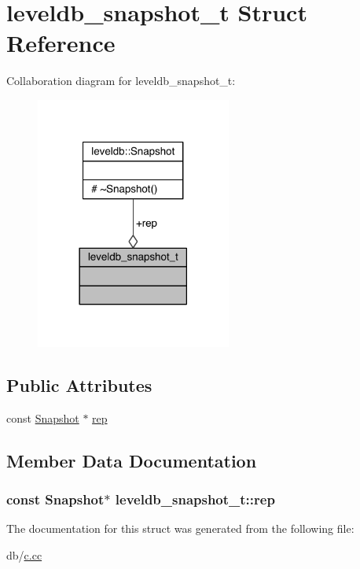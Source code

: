 \hypertarget{structleveldb__snapshot__t}{}\section{leveldb\+\_\+snapshot\+\_\+t Struct Reference}
\label{structleveldb__snapshot__t}


Collaboration diagram for leveldb\+\_\+snapshot\+\_\+t\+:\nopagebreak
\begin{figure}[H]
\begin{center}
\leavevmode
\includegraphics[width=182pt]{structleveldb__snapshot__t__coll__graph}
\end{center}
\end{figure}
\subsection*{Public Attributes}
\begin{DoxyCompactItemize}
\item 
const \hyperlink{classleveldb_1_1_snapshot}{Snapshot} $\ast$ \hyperlink{structleveldb__snapshot__t_a36f57ffdcd88fa73322d8e2e637e3b6a}{rep}
\end{DoxyCompactItemize}


\subsection{Member Data Documentation}
\hypertarget{structleveldb__snapshot__t_a36f57ffdcd88fa73322d8e2e637e3b6a}{}
\subsubsection[{rep}]{\setlength{\rightskip}{0pt plus 5cm}const {\bf Snapshot}$\ast$ leveldb\+\_\+snapshot\+\_\+t\+::rep}\label{structleveldb__snapshot__t_a36f57ffdcd88fa73322d8e2e637e3b6a}


The documentation for this struct was generated from the following file\+:\begin{DoxyCompactItemize}
\item 
db/\hyperlink{c_8cc}{c.\+cc}\end{DoxyCompactItemize}
